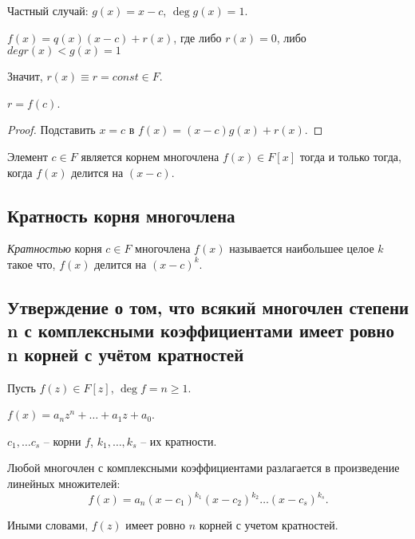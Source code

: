 Частный случай: $g(x) = x - c$, $\deg g(x) = 1$.

$f(x) = q(x) (x - c) + r(x)$, где либо $r(x) = 0$, либо $deg r(x) < g(x) = 1$

Значит, $r(x) \equiv r = const \in F$.

\begin{theorem}
    $r = f(c)$.
\end{theorem}

\begin{proof}
    Подставить $x = c$ в $f(x) = (x - c)g(x) + r(x)$.
\end{proof}

\begin{corollary}
    Элемент $c \in F$ является корнем многочлена $f(x) \in F[x]$ тогда и только тогда, когда $f(x)$ делится на $(x - c)$.
\end{corollary}


\subsection{Кратность корня многочлена}

\begin{definition}
    \textit{Кратностью} корня $c \in F$ многочлена $f(x)$ называется наибольшее целое $k$ такое что, $f(x)$ делится на $(x - c)^k$.
\end{definition}

\subsection{Утверждение о том, что всякий многочлен степени n с комплексными коэффициентами имеет ровно n корней с учётом кратностей}

\begin{corollary}
    Пусть $f(z) \in F[z]$, $\deg f = n \geq 1$.

    $f(x) = a_n z^n + \dots + a_1 z + a_0$.

    $c_1, \dots c_s$ -- корни $f$, $k_1, \dots, k_s$ -- их кратности.

    \bigskip
    Любой многочлен с комплексными коэффициентами разлагается в произведение линейных множителей:
    \begin{equation*}
        f(x) = a_n (x - c_1)^{k_1} (x - c_2)^{k_2} \dots (x - c_s)^{k_s}
    .\end{equation*}

    Иными словами, $f(z)$ имеет ровно $n$ корней с учетом кратностей.
\end{corollary}

